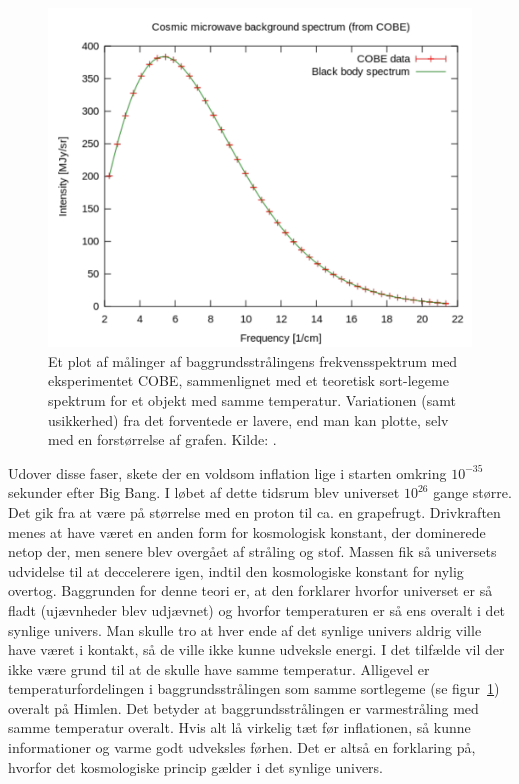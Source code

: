 \begin{figure}[t]
    \centering
    \includegraphics[width = .9\textwidth]{Kosmo/2017/img/cmbplanck.pdf}
    \caption{Et plot af målinger af baggrundsstrålingens frekvensspektrum med eksperimentet COBE, sammenlignet med et teoretisk sort-legeme spektrum for et objekt med samme temperatur. Variationen (samt usikkerhed) fra det forventede er lavere, end man kan plotte, selv med en forstørrelse af grafen. Kilde: \cite{CosmicMicrowaveBackground}.}
    \label{fig:cmbplanck}
\end{figure}

Udover disse faser, skete der en voldsom inflation lige i starten omkring $10^{-35}$ sekunder efter Big Bang. I løbet af dette tidsrum blev universet $10^{26}$ gange større. Det gik fra at være på størrelse med en proton til ca. en grapefrugt. Drivkraften menes at have været en anden form for kosmologisk konstant, der dominerede netop der, men senere blev overgået af stråling og stof. Massen fik så universets udvidelse til at deccelerere igen, indtil den kosmologiske konstant for nylig overtog. Baggrunden for denne teori er, at den forklarer hvorfor universet er så fladt (ujævnheder blev udjævnet) og hvorfor temperaturen er så ens overalt i det synlige univers. Man skulle tro at hver ende af det synlige univers aldrig ville have været i kontakt, så de ville ikke kunne udveksle energi. I det tilfælde vil der ikke være grund til at de skulle have samme temperatur. Alligevel er temperaturfordelingen i baggrundsstrålingen som samme sortlegeme (se figur~\ref{fig:cmbplanck}) overalt på Himlen. Det betyder at baggrundsstrålingen er varmestråling med samme temperatur overalt. Hvis alt lå virkelig tæt før inflationen, så kunne informationer og varme godt udveksles førhen. Det er altså en forklaring på, hvorfor det kosmologiske princip gælder i det synlige univers.


